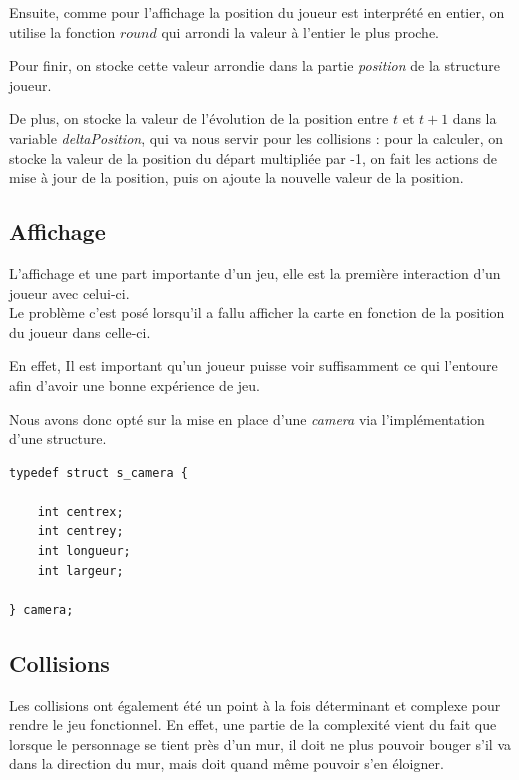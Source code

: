 \documentclass[12pt]{article}
\begin{document}
		Ensuite, comme pour l'affichage la position du joueur est interprété en entier, on utilise la fonction \(round\) qui arrondi la valeur à l'entier le plus proche.
		
		Pour finir, on stocke cette valeur arrondie dans la partie \textit{position} de la structure joueur.
		
		\medskip
		De plus, on stocke la valeur de l'évolution de la position entre \(t\) et \(t+1\) dans la variable \textit{deltaPosition}, qui va nous servir pour les collisions : pour la calculer, on stocke la valeur de la position du départ multipliée par -1, on fait les actions de mise à jour de la position, puis on ajoute la nouvelle valeur de la position.
		
		\newpage
		
		\subsection{Affichage}
		
			L'affichage et une part importante d'un jeu, elle est la première interaction d'un joueur avec celui-ci.\\


			Le problème c'est posé lorsqu'il a fallu afficher la carte en fonction de la position du joueur dans celle-ci.

			En effet, Il est important qu'un joueur puisse voir suffisamment ce qui l'entoure afin d'avoir une bonne expérience de jeu.

			Nous avons donc opté sur la mise en place d'une \textit{camera} via l'implémentation d'une structure.
			\begin{lstlisting}[title=Structure Camera]
typedef struct s_camera {
	
	int centrex;
	int centrey;
	int longueur;
	int largeur;
				
} camera;
			\end{lstlisting}
		
		\newpage

		\subsection{Collisions}
		
		Les collisions ont également été un point à la fois déterminant et complexe pour rendre le jeu fonctionnel. En effet, une partie de la complexité vient du fait que lorsque le personnage se tient près d'un mur, il doit ne plus pouvoir bouger s'il va dans la direction du mur, mais doit quand même pouvoir s'en éloigner.
		
\end{document}
